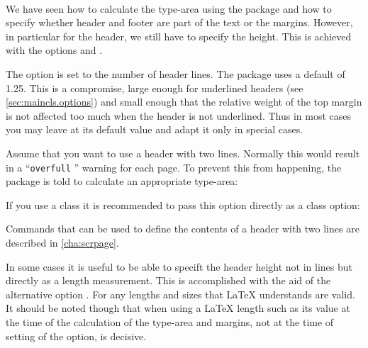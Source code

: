 %
%
\begin{Declaration}
  \\
\end{Declaration}%
We have seen how to calculate the type-area using the
 package and how to specify whether header and
footer are part of the text or the margins. However, in particular for
the header, we still have to specify the height. This is achieved with
the options  and
.

The option  is set to the number of header
lines. The  package uses a default of 1.25. This is
a compromise, large enough for underlined headers (see
\autoref{sec:maincls.options}) and small enough that the relative
weight of the top margin is not affected too much when the header is
not underlined. Thus in most cases you may leave  at
its default value and adapt it only in special cases.

\begin{Example}
  Assume that you want to use a header with two lines. Normally this would
  result in a ``\texttt{overfull} '' warning for each page. To
  prevent this from happening, the  package is told to
  calculate an appropriate type-area:
If you use a {\KOMAScript} class it is recommended to pass this option
directly as a class option:
Commands that can be used to define the contents of a header with two
lines are described in \autoref{cha:scrpage}.
\end{Example}

In some cases it is useful to be able to specift the header height not
in lines but directly as a length measurement. This is accomplished
with the aid of the alternative option . For
 any lengths and sizes that \LaTeX{} understands are
valid. It should be noted though that when using a \LaTeX{} length
such as  its value at the time of the calculation
of the type-area and margins, not at the time of setting of the
option, is decisive.

